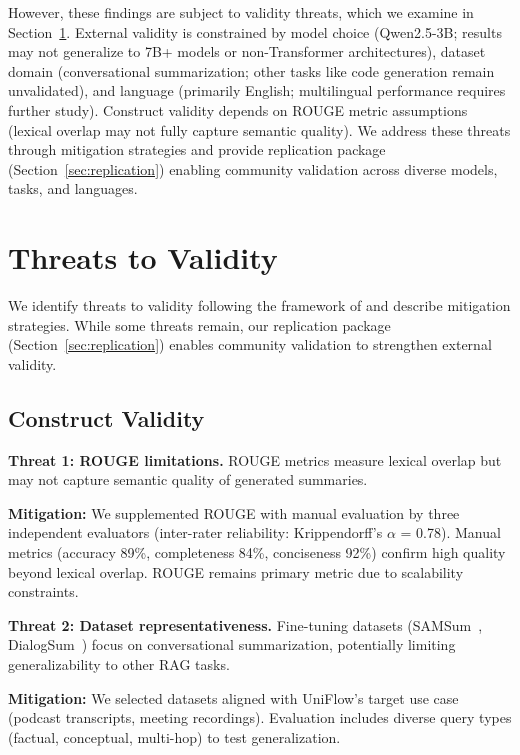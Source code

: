 \documentclass[pdflatex,sn-basic]{sn-jnl}
\begin{document}
However, these findings are subject to validity threats, which we examine in Section~\ref{sec:threats}. External validity is constrained by model choice (Qwen2.5-3B; results may not generalize to 7B+ models or non-Transformer architectures), dataset domain (conversational summarization; other tasks like code generation remain unvalidated), and language (primarily English; multilingual performance requires further study). Construct validity depends on ROUGE metric assumptions (lexical overlap may not fully capture semantic quality). We address these threats through mitigation strategies and provide replication package (Section~\ref{sec:replication}) enabling community validation across diverse models, tasks, and languages.

\section{Threats to Validity}
\label{sec:threats}

\noindent
We identify threats to validity following the framework of \cite{wohlin2012experimentation} and describe mitigation strategies. While some threats remain, our replication package (Section~\ref{sec:replication}) enables community validation to strengthen external validity.

\subsection{Construct Validity}
\label{sec:threats-construct}

\noindent
\textbf{Threat 1: ROUGE limitations.} 
ROUGE metrics measure lexical overlap but may not capture semantic quality of generated summaries.

\noindent
\textbf{Mitigation:} 
We supplemented ROUGE with manual evaluation by three independent evaluators (inter-rater reliability: Krippendorff's $\alpha$ = 0.78). Manual metrics (accuracy 89\%, completeness 84\%, conciseness 92\%) confirm high quality beyond lexical overlap. ROUGE remains primary metric due to scalability constraints.

\noindent
\textbf{Threat 2: Dataset representativeness.} 
Fine-tuning datasets (SAMSum~\citep{gliwa2019samsum}, DialogSum~\citep{chen2021dialogsum}) focus on conversational summarization, potentially limiting generalizability to other RAG tasks.

\noindent
\textbf{Mitigation:} 
We selected datasets aligned with UniFlow's target use case (podcast transcripts, meeting recordings). Evaluation includes diverse query types (factual, conceptual, multi-hop) to test generalization.
\end{document}
